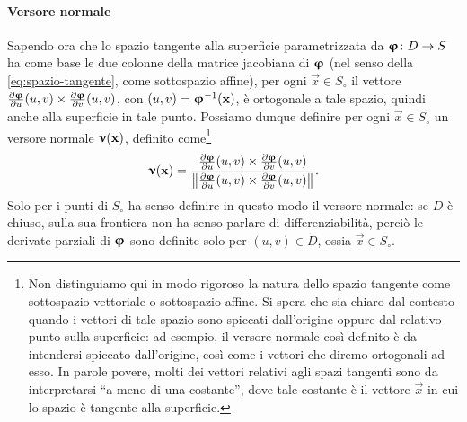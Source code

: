 \paragraph{Versore normale}
Sapendo ora che lo spazio tangente alla superficie parametrizzata da $\bm{\upvarphi}\colon D\to S$ ha come base le due colonne della matrice jacobiana di $\bm{\upvarphi}$ (nel senso della \eqref{eq:spazio-tangente}, come sottospazio affine), per ogni $\vec x\in S_\circ$ il vettore $\frac{\partial {\bm{\upvarphi}}}{\partial {u}}(u,v)\times\frac{\partial {\bm{\upvarphi}}}{\partial {v}}(u,v)$, con $(u,v)=\bm{\upvarphi}^{-1}(\mathbf{x})$, è ortogonale a tale spazio, quindi anche alla superficie in tale punto.
Possiamo dunque definire per ogni $\vec x\in S_\circ$ un versore normale $\bm{\upnu}(\mathbf{x})$, definito come\footnote{
		Non distinguiamo qui in modo rigoroso la natura dello spazio tangente come sottospazio vettoriale o sottospazio affine.
		Si spera che sia chiaro dal contesto quando i vettori di tale spazio sono spiccati dall'origine oppure dal relativo punto sulla superficie: ad esempio, il versore normale cos\`i definito è da intendersi spiccato dall'origine, cos\`i come i vettori che diremo ortogonali ad esso.
		In parole povere, molti dei vettori relativi agli spazi tangenti sono da interpretarsi ``a meno di una costante'', dove tale costante è il vettore $\vec x$ in cui lo spazio è tangente alla superficie.
	}
\begin{equation}
	\bm{\upnu}(\mathbf{x})=\frac{\frac{\partial {\bm{\upvarphi}}}{\partial {u}}(u,v)\times\frac{\partial {\bm{\upvarphi}}}{\partial {v}}(u,v)}{\left\|{\frac{\partial {\bm{\upvarphi}}}{\partial {u}}(u,v)\times\frac{\partial {\bm{\upvarphi}}}{\partial {v}}(u,v)}\right\|}.
\end{equation}
Solo per i punti di $S_\circ$ ha senso definire in questo modo il versore normale: se $D$ è chiuso, sulla sua frontiera non ha senso parlare di differenziabilità, perciò le derivate parziali di $\bm{\upvarphi}$ sono definite solo per $(u,v)\in\mathring{D}$, ossia $\vec x\in S_\circ$.
